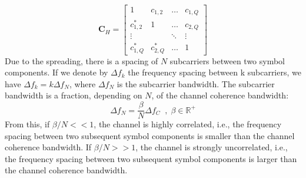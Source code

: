 \documentclass[12pt]{article}
\begin{document}
\begin{equation}
\textbf{C}_H = 
\begin{bmatrix}
	1 & c_{1,2} & \hdots & c_{1,Q}  \\
	c_{1,2}^* & 1 & \hdots & c_{2,Q} \\
	\vdots & & \ddots & \vdots \\
	c_{1,Q}^* & c_{2,Q}^* & \hdots & 1
\end{bmatrix}
\label{eq:correl_mat}
\end{equation}
Due to the spreading, there is a spacing of $N$ subcarriers between two symbol components.  If we denote by $\Delta f_{k}$ the frequency spacing between k subcarriers, we have $\Delta f_{k} = k \Delta f_N$, where $\Delta f_N$ is the subcarrier bandwidth. The subcarrier bandwidth is a fraction, depending on $N$, of the channel coherence bandwidth:
\begin{equation}
	\Delta f_N = \frac{\beta}{N} \Delta f_C \; \; , \; \beta \in \mathbb{R}^+
	\label{eq:subcar_BW}
\end{equation}
From this, if $\beta/N << 1$, the channel is highly correlated, i.e., the frequency spacing between two subsequent symbol components is smaller than the channel coherence bandwidth. If $\beta/N >> 1$, the channel is strongly uncorrelated, i.e., the frequency spacing between two subsequent symbol components is larger than the channel coherence bandwidth.
\end{document}
